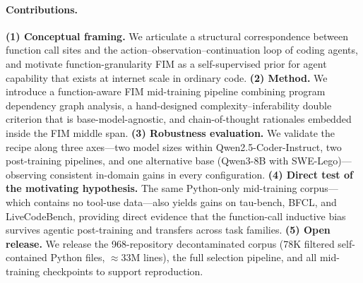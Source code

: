 \paragraph{Contributions.}
\textbf{(1) Conceptual framing.} We articulate a structural correspondence
between function call sites and the action--observation--continuation loop
of coding agents, and motivate function-granularity FIM as a
self-supervised prior for agent capability that exists at internet scale
in ordinary code.
\textbf{(2) Method.} We introduce a function-aware FIM mid-training
pipeline combining program dependency graph analysis, a hand-designed
complexity--inferability double criterion that is base-model-agnostic, and
chain-of-thought rationales embedded inside the FIM middle span.
\textbf{(3) Robustness evaluation.} We validate the recipe along three
axes---two model sizes within Qwen2.5-Coder-Instruct, two post-training
pipelines, and one alternative base (Qwen3-8B with SWE-Lego)---observing
consistent in-domain gains in every configuration.
\textbf{(4) Direct test of the motivating hypothesis.} The same Python-only
mid-training corpus---which contains no tool-use data---also yields gains
on tau-bench, BFCL, and LiveCodeBench, providing direct evidence that the
function-call inductive bias survives agentic post-training and transfers
across task families.
\textbf{(5) Open release.} We release the 968-repository decontaminated
corpus (78K filtered self-contained Python files, $\approx 33\mathrm{M}$
lines), the full selection pipeline, and all mid-training checkpoints to
support reproduction.